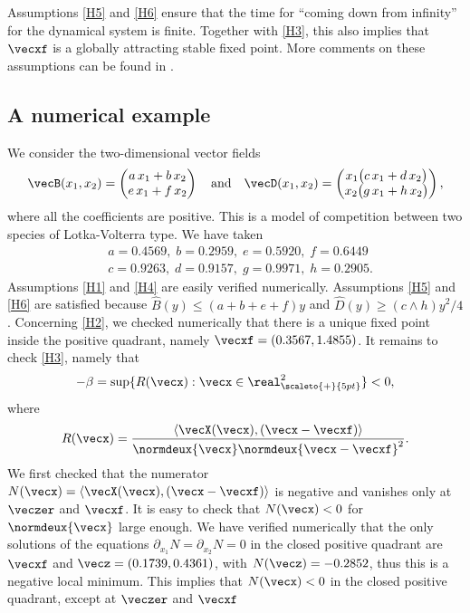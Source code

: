 Assumptions \eqref{H5} and \eqref{H6} ensure that the time for ``coming down from infinity'' for the
dynamical system is finite. Together with \eqref{H3}, this also implies that $\vecxf$ is a
globally attracting stable fixed point. More comments on these assumptions can be found in
\cite{ccm2}.

\subsection{A numerical example}

We consider the two-dimensional vector fields
\[
\vecB(x_1,x_{2})=
\begin{pmatrix}
a\,x_1+b\,x_{2}\\
e\,x_1+f\,x_{2}
\end{pmatrix}
\quad
\text{and}
\quad
\vecD(x_1,x_{2})=
\begin{pmatrix}
x_1\bigl(c\,x_1+d\,x_{2}\bigr)\\
x_{2}\bigl(g\,x_1+h\,x_{2}\bigr)
\end{pmatrix},
\]
where all the coefficients are positive. This is a model of competition between two species of Lotka-Volterra type.
We have taken
\begin{align*}
& a= 0.4569,\; b= 0.2959,\;e= 0.5920,\;f= 0.6449\\
& c= 0.9263,\;d= 0.9157,\;g= 0.9971,\;h= 0.2905.
\end{align*}
Assumptions \eqref{H1} and \eqref{H4} are easily verified numerically.
Assumptions \eqref{H5} and \eqref{H6} are satisfied because $\widehat{B}(y)\leq (a+b+e+f)y$ and
$\widehat{D}(y)\geq (c\wedge h)y^2/4$.
Concerning \eqref{H2}, we checked numerically that there is a unique fixed point inside the positive quadrant, namely
$\vecxf=(0.3567,1.4855)$.
It remains to check \eqref{H3}, namely that
\[
-\beta= \sup\{R(\vecx):\vecx \in \real_{\scaleto{+}{5pt}}^2\}<0,
\]
where
\[
R(\vecx)=\frac{\langle \vecX(\vecx),(\vecx-\vecxf)\rangle}{\normdeux{\vecx}\normdeux{\vecx-\vecxf}^{2}}.
\]
We first checked that the numerator $N(\vecx)=\langle\vecX(\vecx),(\vecx-\vecxf)\rangle$ is negative and vanishes only at
$\veczer$ and $\vecxf$. It is easy to check that $N(\vecx)<0$ for $\normdeux{\vecx}$ large enough. We have verified
numerically that the only solutions of the equations $\partial_{x_1}N=\partial_{x_2}N=0$ in the closed positive quadrant are
$\vecxf$ and $\vecz=(0.1739, 0.4361)$, with $N(\vecz)= -0.2852$, thus this is a negative local minimum.
This implies that $N(\vecx)<0$ in the closed positive quadrant, except at $\veczer$ and $\vecxf$
